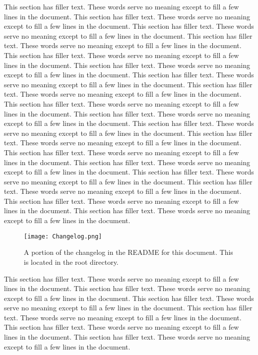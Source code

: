 This section has filler text. These words serve no meaning except to fill a few lines in the document. This section has filler text. These words serve no meaning except to fill a few lines in the document. This section has filler text. These words serve no meaning except to fill a few lines in the document. This section has filler text. These words serve no meaning except to fill a few lines in the document. This section has filler text. These words serve no meaning except to fill a few lines in the document. This section has filler text. These words serve no meaning except to fill a few lines in the document. This section has filler text. These words serve no meaning except to fill a few lines in the document. This section has filler text. These words serve no meaning except to fill a few lines in the document. This section has filler text. These words serve no meaning except to fill a few lines in the document. This section has filler text. These words serve no meaning except to fill a few lines in the document. This section has filler text. These words serve no meaning except to fill a few lines in the document. This section has filler text. These words serve no meaning except to fill a few lines in the document. This section has filler text. These words serve no meaning except to fill a few lines in the document. This section has filler text. These words serve no meaning except to fill a few lines in the document. This section has filler text. These words serve no meaning except to fill a few lines in the document. This section has filler text. These words serve no meaning except to fill a few lines in the document. This section has filler text. These words serve no meaning except to fill a few lines in the document. This section has filler text. These words serve no meaning except to fill a few lines in the document.

\begin{figure}[!h]
	\centering
	\texttt{[image: Changelog.png]}
	\caption{A portion of the changelog in the README for this document. This is located in the root directory.}
\end{figure}

This section has filler text. These words serve no meaning except to fill a few lines in the document. This section has filler text. These words serve no meaning except to fill a few lines in the document. This section has filler text. These words serve no meaning except to fill a few lines in the document. This section has filler text. These words serve no meaning except to fill a few lines in the document. This section has filler text. These words serve no meaning except to fill a few lines in the document. This section has filler text. These words serve no meaning except to fill a few lines in the document.

